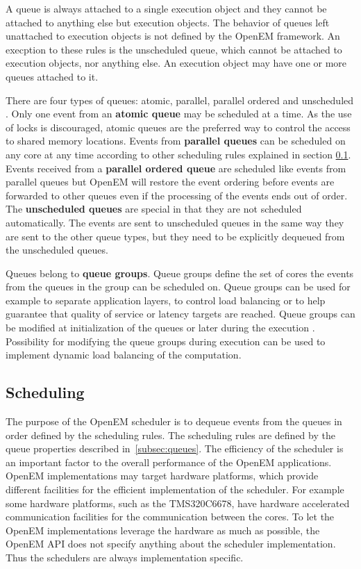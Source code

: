 A queue is always attached to a single execution object and they cannot be attached to anything else but execution objects. The behavior of queues left unattached to execution objects is not defined by the OpenEM framework. An execption to these rules is the unscheduled queue, which cannot be attached to execution objects, nor anything else. An execution object may have one or more queues attached to it.~\cite{openemintro}

There are four types of queues: atomic, parallel, parallel ordered and unscheduled \cite{openemintro}. Only one event from an \textbf{atomic queue} may be scheduled at a time. As the use of locks is discouraged, atomic queues are the preferred way to control the access to shared memory locations. Events from \textbf{parallel queues} can be scheduled on any core at any time according to other scheduling rules explained in section \ref{subsec:schedule}. Events received from a \textbf{parallel ordered queue} are scheduled like events from parallel queues but OpenEM will restore the event ordering before events are forwarded to other queues even if the processing of the events ends out of order. The \textbf{unscheduled queues} are special in that they are not scheduled automatically. The events are sent to unscheduled queues in the same way they are sent to the other queue types, but they need to be explicitly dequeued from the unscheduled queues.~\cite{openempage}

Queues belong to \textbf{queue groups}. Queue groups define the set of cores the events from the queues in the group can be scheduled on. Queue groups can be used for example to separate application layers, to control load balancing or to help guarantee that quality of service or latency targets are reached. \cite{openemintro} Queue groups can be modified at initialization of the queues or later during the execution \cite{openempage}. Possibility for modifying the queue groups during execution can be used to implement dynamic load balancing of the computation.

\subsection{Scheduling}
\label{subsec:schedule}
The purpose of the OpenEM scheduler is to dequeue events from the queues in order defined by the scheduling rules. The scheduling rules are defined by the queue properties described in~\ref{subsec:queues}. The efficiency of the scheduler is an important factor to the overall performance of the OpenEM applications.~\cite{openempage} OpenEM implementations may target hardware platforms, which provide different facilities for the efficient implementation of the scheduler. For example some hardware platforms, such as the TMS320C6678, have hardware accelerated communication facilities for the communication between the cores. To let the OpenEM implementations leverage the hardware as much as possible, the OpenEM API does not specify anything about the scheduler implementation. Thus the schedulers are always implementation specific.

